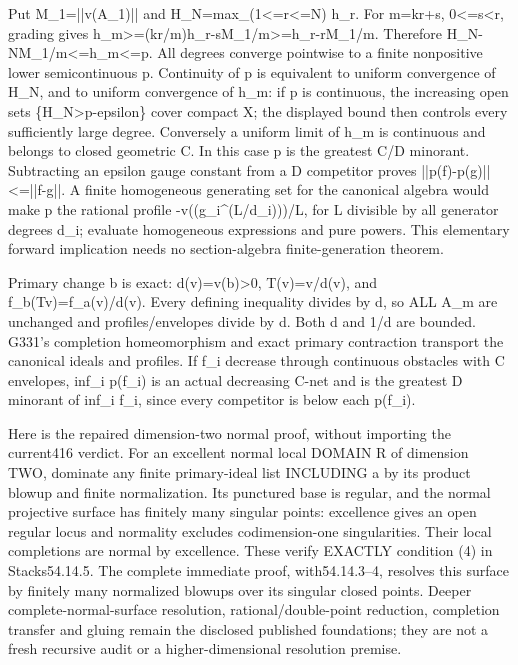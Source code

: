 Put M\_1=||v(A\_1)|| and H\_N=max\_(1\textless{}=r\textless{}=N) h\_r. For m=kr+s, 0\textless{}=s\textless{}r, grading gives h\_m\textgreater{}=(kr/m)h\_r-sM\_1/m\textgreater{}=h\_r-rM\_1/m. Therefore H\_N-NM\_1/m\textless{}=h\_m\textless{}=p. All degrees converge pointwise to a finite nonpositive lower semicontinuous p. Continuity of p is equivalent to uniform convergence of H\_N, and to uniform convergence of h\_m: if p is continuous, the increasing open sets \{H\_N\textgreater{}p-epsilon\} cover compact X; the displayed bound then controls every sufficiently large degree. Conversely a uniform limit of h\_m is continuous and belongs to closed geometric C. In this case p is the greatest C/D minorant. Subtracting an epsilon gauge constant from a D competitor proves ||p(f)-p(g)||\textless{}=||f-g||. A finite homogeneous generating set for the canonical algebra would make p the rational profile -v((g\_i\textasciicircum{}(L/d\_i)))/L, for L divisible by all generator degrees d\_i; evaluate homogeneous expressions and pure powers. This elementary forward implication needs no section-algebra finite-generation theorem.

Primary change b is exact: d(v)=v(b)\textgreater{}0, T(v)=v/d(v), and f\_b(Tv)=f\_a(v)/d(v). Every defining inequality divides by d, so ALL A\_m are unchanged and profiles/envelopes divide by d. Both d and 1/d are bounded. G331's completion homeomorphism and exact primary contraction transport the canonical ideals and profiles. If f\_i decrease through continuous obstacles with C envelopes, inf\_i p(f\_i) is an actual decreasing C-net and is the greatest D minorant of inf\_i f\_i, since every competitor is below each p(f\_i).

Here is the repaired dimension-two normal proof, without importing the current416 verdict. For an excellent normal local DOMAIN R of dimension TWO, dominate any finite primary-ideal list INCLUDING a by its product blowup and finite normalization. Its punctured base is regular, and the normal projective surface has finitely many singular points: excellence gives an open regular locus and normality excludes codimension-one singularities. Their local completions are normal by excellence. These verify EXACTLY condition (4) in Stacks54.14.5. The complete immediate proof, with54.14.3--4, resolves this surface by finitely many normalized blowups over its singular closed points. Deeper complete-normal-surface resolution, rational/double-point reduction, completion transfer and gluing remain the disclosed published foundations; they are not a fresh recursive audit or a higher-dimensional resolution premise.

